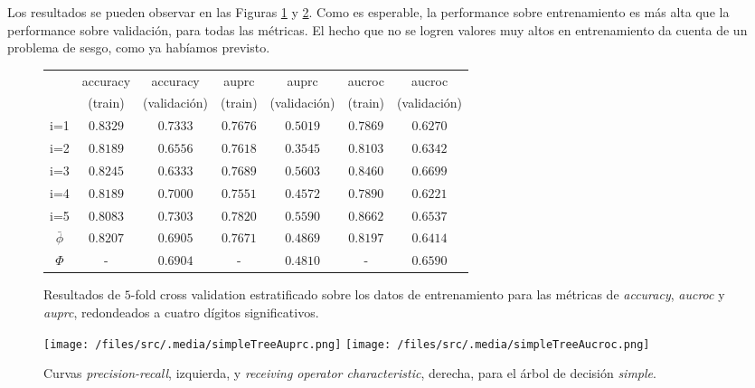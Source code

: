 Los resultados se pueden observar en las Figuras \ref{metricas_simple} y \ref{curvas_simple}. Como es esperable, la performance sobre entrenamiento es más alta que la performance sobre validación, para todas las métricas. El hecho que no se logren valores muy altos en entrenamiento da cuenta de un problema de sesgo, como ya habíamos previsto.

\vspace{0.5em}
\begin{figure}[!htbp]
\begin{center}
\begin{tabular}{ |c|c|c|c|c|c|c| } 
\hline
            & accuracy  & accuracy      & auprc     & auprc         & aucroc   & aucroc      \\
            & (train)   & (validación)  & (train)   & (validación)  & (train)   & (validación) \\      
\hline
i=1         & $0.8329$  & $0.7333$      & $0.7676$  & $0.5019$      & $0.7869$  & $0.6270$ \\
i=2         & $0.8189$  & $0.6556$      & $0.7618$  & $0.3545$      & $0.8103$  & $0.6342$ \\
i=3         & $0.8245$  & $0.6333$      & $0.7689$  & $0.5603$      & $0.8460$  & $0.6699$ \\
i=4         & $0.8189$  & $0.7000$      & $0.7551$  & $0.4572$      & $0.7890$  & $0.6221$ \\
i=5         & $0.8083$  & $0.7303$      & $0.7820$  & $0.5590$      & $0.8662$  & $0.6537$ \\
$\bar\phi$  & $0.8207$  & $0.6905$      & $0.7671$  & $0.4869$      & $0.8197$  & $0.6414$ \\
$\Phi$      & -         & $0.6904$      & -         & $0.4810$      & -         & $0.6590$ \\
\hline
\end{tabular}
\end{center}
\caption{Resultados de $5$-fold cross validation estratificado sobre los datos de entrenamiento para las métricas de \textit{accuracy}, \textit{aucroc} y \textit{auprc}, redondeados a cuatro dígitos significativos.}\label{metricas_simple}
\end{figure}

\begin{figure}[!htbp]
    \centering 
    \texttt{[image: /files/src/.media/simpleTreeAuprc.png]}
    \texttt{[image: /files/src/.media/simpleTreeAucroc.png]}
    \caption{Curvas \textit{precision-recall}, izquierda, y \textit{receiving operator characteristic}, derecha, para el árbol de decisión \textit{simple}.}
    \label{curvas_simple}
\end{figure}

